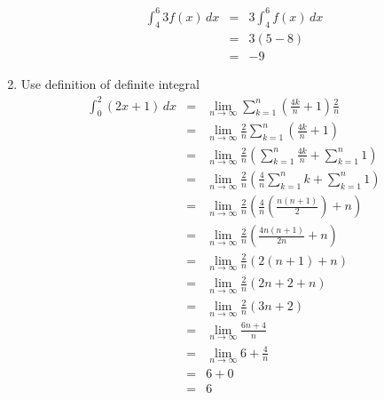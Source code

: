 \documentclass{article}
\begin{document}
\begin{enumerate}
\begin{eqnarray}
            \int_4^6{3f(x)\,dx} &=& 3\int_4^6{f(x)\,dx} \\
                                &=& 3\left(5 - 8\right) \\
                                &=& -9
        \end{eqnarray}
    \item Use definition of definite integral
        \begin{eqnarray}
            \int_0^2{\left(2x + 1\right)\,dx} &=& \lim_{n \to \infty}{\sum_{k = 1}^n{\left(\frac{4k}{n} + 1\right)\frac{2}{n}}} \\
                                              &=& \lim_{n \to \infty}{\frac{2}{n}\sum_{k = 1}^n{\left(\frac{4k}{n} + 1\right)}} \\
                                              &=& \lim_{n \to \infty}{\frac{2}{n}\left(\sum_{k = 1}^n{\frac{4k}{n}} + \sum_{k = 1}^n{1}\right)} \\
                                              &=& \lim_{n \to \infty}{\frac{2}{n}\left(\frac{4}{n}\sum_{k = 1}^n{k} + \sum_{k = 1}^n{1}\right)} \\
                                              &=& \lim_{n \to \infty}{\frac{2}{n}\left(\frac{4}{n}\left(\frac{n(n + 1)}{2}\right) + n\right)} \\
                                              &=& \lim_{n \to \infty}{\frac{2}{n}\left(\frac{4n(n + 1)}{2n} + n\right)} \\
                                              &=& \lim_{n \to \infty}{\frac{2}{n}\left(2(n + 1) + n\right)} \\
                                              &=& \lim_{n \to \infty}{\frac{2}{n}\left(2n + 2 + n\right)} \\
                                              &=& \lim_{n \to \infty}{\frac{2}{n}\left(3n + 2\right)} \\
                                              &=& \lim_{n \to \infty}{\frac{6n + 4}{n}} \\
                                              &=& \lim_{n \to \infty}{6 + \frac{4}{n}} \\
                                              &=& 6 + 0 \\
                                              &=& 6
        \end{eqnarray}
\end{enumerate}
\end{document}
